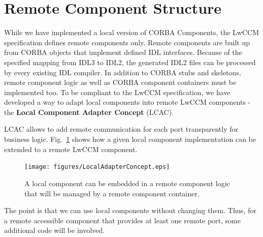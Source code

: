 
\section{Remote Component Structure}

While we have implemented a local version of CORBA Components, 
the LwCCM specification defines remote components only.
Remote components are built up from CORBA objects that implement defined
IDL interfaces.
Because of the specified mapping from IDL3 to IDL2, the generated IDL2 files 
can be processed by every existing IDL compiler. In addition to CORBA stubs
and skeletons, remote component logic as well as CORBA component containers
must be implemented too. 
To be compliant to the LwCCM specification, we have developed a way to
adapt local components into remote LwCCM components - the 
{\bf Local Component Adapter Concept} (LCAC).

LCAC allows to add remote communication
for each port transparently for business logic.
Fig.~\ref{LcacOverview} shows how a given local component implementation
can be extended to a remote LwCCM component.

\begin{figure}[htbp]
    \begin{center}
    \texttt{[image: figures/LocalAdapterConcept.eps]}
    \caption{A local component can be embedded in a remote component logic
    that will be managed by a remote component container.}
    \label{LcacOverview}            
    \end{center}
\end{figure}

\noindent
The point is that we can use local components without changing them.
Thus, for a remote accessible component that provides at least one remote 
port, some additional code will be involved.

